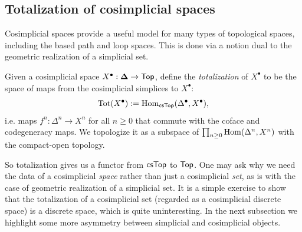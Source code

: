 \subsection{Totalization of cosimplicial spaces} 
Cosimplicial spaces provide a useful model for many types of topological spaces, including the based path and loop spaces. This is done via a notion dual to the geometric realization of a simplicial set.

\begin{defn}
Given a cosimplicial space $X^\bullet: \boldsymbol{\Delta}\to \mathsf{Top}$, define the \emph{totalization} of $X^\bullet$ to be the space of maps from the cosimplicial simplices to $X^\bullet$:
\[\operatorname{Tot}(X^\bullet) := \operatorname{Hom}_{\mathsf{csTop}}(\Delta^\bullet, X^\bullet),\]
i.e. maps $f^n: \Delta^n \to X^n$ for all $n\geq 0$ that commute with the coface and codegeneracy maps. We topologize it as a subspace of $\prod_{n\geq 0} \operatorname{Hom}(\Delta^n, X^n)$ with the compact-open topology.
\end{defn}

So totalization gives us a functor from $\mathsf{csTop}$ to $\mathsf{Top}$. One may ask why we need the data of a cosimplicial \emph{space} rather than just a cosimplicial \emph{set}, as is with the case of geometric realization of a simplicial set. It is a simple exercise to show that the totalization of a cosimplicial set (regarded as a cosimplicial discrete space) is a discrete space, which is quite uninteresting. In the next subsection we highlight some more  asymmetry between simplicial and cosimplicial objects. 

